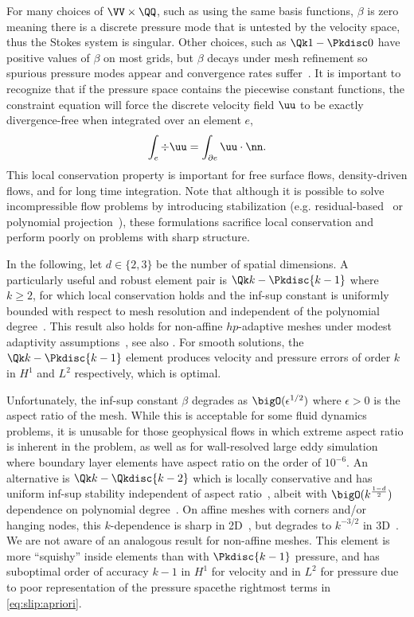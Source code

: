 For many choices of $\VV \times \QQ$, such as using the same basis functions, $\beta$ is zero meaning there is a discrete pressure mode that is untested by the velocity space, thus the Stokes system is singular.
Other choices, such as $\Qk 1-\Pkdisc 0$ have positive values of $\beta$ on most grids, but $\beta$ decays under mesh refinement so spurious pressure modes appear and convergence rates suffer~\citep{brenner2008mathematical,chapelle1993inf,babuska1997babuska}.
It is important to recognize that if the pressure space contains the piecewise constant functions, the constraint equation will force the discrete velocity field $\uu$ to be exactly divergence-free when integrated over an element $e$,
\begin{gather*}
  \int_e \div\uu = \int_{\partial e} \uu\cdot\nn.
\end{gather*}
This local conservation property is important for free surface flows, density-driven flows, and for long time integration.
Note that although it is possible to solve incompressible flow problems by introducing stabilization (e.g. residual-based~\citep{hughes1986new} or polynomial projection~\citep{dohrmann2004stabilized}), these formulations sacrifice local conservation and perform poorly on problems with sharp structure.

In the following, let $d\in \{2,3\}$ be the number of spatial dimensions.
A particularly useful and robust element pair is $\Qk k-\Pkdisc{k-1}$ where $k \ge 2$, for which local conservation holds and the inf-sup constant is uniformly bounded with respect to mesh resolution and independent of the polynomial degree~\citep{bernardi1999uniform}.
This result also holds for non-affine $hp$-adaptive meshes under modest adaptivity assumptions~\citep{schieweck2008uniformly}, see also \citet{matthies2002inf}.
For smooth solutions, the $\Qk k-\Pkdisc{k-1}$ element produces velocity and pressure errors of order $k$ in $H^1$ and $L^2$ respectively, which is optimal.

Unfortunately, the inf-sup constant $\beta$ degrades as $\bigO(\epsilon^{1/2})$ where $\epsilon > 0$ is the aspect ratio of the mesh.
While this is acceptable for some fluid dynamics problems, it is unusable for those geophysical flows in which extreme aspect ratio is inherent in the problem, as well as for wall-resolved large eddy simulation where boundary layer elements have aspect ratio on the order of $10^{-6}$.
An alternative is $\Qk k - \Qkdisc{k-2}$ which is locally conservative and has uniform inf-sup stability independent of aspect ratio~\citep{stenberg1996mixed,schotzau1998mhf}, albeit with $\bigO(k^\frac{1-d}{2})$ dependence on polynomial degree~\citep{maday1992pn}.
On affine meshes with corners and/or hanging nodes, this $k$-dependence is sharp in 2D~\citep{schotzau1999mhf}, but degrades to $k^{-3/2}$ in 3D~\citep{toselli2003mhf}.
We are not aware of an analogous result for non-affine meshes.
This element is more ``squishy'' inside elements than with $\Pkdisc{k-1}$ pressure, and has suboptimal order of accuracy $k-1$ in $H^1$ for velocity and in $L^2$ for pressure due to poor representation of the pressure spacethe rightmost terms in \eqref{eq:slip:apriori}.

